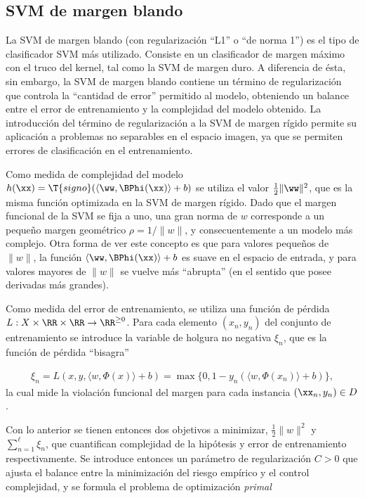 %
%
\subsection{SVM de margen blando}
%
La SVM de margen blando (con regularización ``L1'' o ``de norma 1'')
es el tipo de clasificador SVM más utilizado.  Consiste en un
clasificador de margen máximo con el truco del kernel, tal como la SVM
de margen duro. A diferencia de ésta, sin embargo, la SVM de margen
blando contiene un término de regularización que controla la
``cantidad de error'' permitido al modelo, obteniendo un balance entre
el error de entrenamiento y la complejidad del modelo obtenido.  La
introducción del término de regularización a la SVM de margen rígido
permite su aplicación a problemas no separables en el espacio imagen,
ya que se permiten errores de clasificación en el entrenamiento.

Como medida de complejidad del modelo
$h(\xx)=\T{signo}(\langle{}\ww,\BPhi(\xx)\rangle{}+b)$
se utiliza el valor $\frac{1}{2}\|\ww\|^2$, que es la misma función optimizada en
la SVM de margen rígido. Dado que el margen funcional
de la SVM se fija a uno, una gran norma de $w$ corresponde a un
pequeño margen geométrico $\rho=1/\|w\|$, y consecuentemente a un modelo más complejo.
Otra forma de ver este concepto es que para valores pequeños de
$\|w\|$, la función $\langle{}\ww,\BPhi(\xx)\rangle+b$ es suave en el
espacio de entrada, y para valores mayores de $\|w\|$ se vuelve más
``abrupta'' (en el sentido que posee derivadas más grandes).

Como medida del error de entrenamiento, se utiliza una función de
pérdida $L:X\times\RR\times\RR\rightarrow\RR^{\geq0}$.  Para cada
elemento $(x_n,y_n)$ del conjunto de entrenamiento se introduce la
variable de holgura no negativa $\xi_n$, que es la función de pérdida
``bisagra''

\begin{align}
\xi_n = 
  L(x,y,\langle{}w,\Phi(x)\rangle+b) =
  \max\{0,1-y_n(\langle{}w,\Phi(x_n)\rangle+b)\},
\end{align}
la cual mide la violación funcional del margen para cada instancia
$(\xx_n,y_n)\in{}D$.

Con lo anterior se tienen entonces dos objetivos a minimizar,
$\frac{1}2{}\|w\|^2$ y $\sum_{n=1}^{\ell}\xi_n$, que cuantifican
complejidad de la hipótesis y error de entrenamiento respectivamente.
Se introduce entonces un parámetro de regularización $C>0$ que
ajusta el balance entre la minimización del riesgo empírico y
el control complejidad, y se formula el problema
de optimización \emph{primal}

